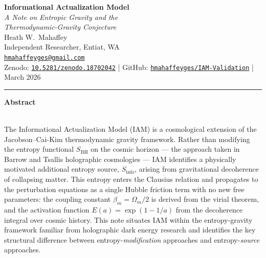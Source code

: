 \documentclass[12pt]{article}
\newcommand{\Oms}{\Omega_m}
\newcommand{\bm}{\beta_m}
\newcommand{\Ea}{E(a)}
\newcommand{\Sbh}{S_\mathrm{BH}}
\newcommand{\Sinfo}{S_\mathrm{info}}
\begin{document}
\begin{center}
  {\LARGE\bfseries\color{iamblue}
    Informational Actualization Model}\\[6pt]
  {\large\itshape
    A Note on Entropic Gravity and the\\
    Thermodynamic-Gravity Conjecture}\\[10pt]
  {\normalsize
    Heath W.\ Mahaffey\\
    Independent Researcher, Entiat, WA\\
    \href{mailto:hmahaffeyges@gmail.com}{\texttt{hmahaffeyges@gmail.com}}}\\[4pt]
  {\small\color{midgray}
    Zenodo: \href{https://doi.org/10.5281/zenodo.18702042}{\texttt{10.5281/zenodo.18702042}}
    \quad|\quad
    GitHub: \href{https://github.com/hmahaffeyges/IAM-Validation}{\texttt{hmahaffeyges/IAM-Validation}}
    \quad|\quad
    March 2026}
\end{center}

\vspace{4pt}
{\color{iamblue}\rule{\linewidth}{1pt}}
\vspace{4pt}

\begin{center}
  \small
    \textbf{Abstract}\\
\end{center}
\begin{center}
  \begin{minipage}{0.80\linewidth}
    \small
    \textbf\\
    The Informational Actualization Model (IAM) is a cosmological extension of the
    Jacobson--Cai-Kim thermodynamic gravity framework.  Rather than modifying the
    entropy functional $\Sbh$ on the cosmic horizon --- the approach taken in Barrow
    and Tsallis holographic cosmologies --- IAM identifies a physically motivated
    additional entropy source, $\Sinfo$, arising from gravitational decoherence of
    collapsing matter.  This entropy enters the Clausius relation and propagates to the
    perturbation equations as a single Hubble friction term with no new free parameters:
    the coupling constant $\bm = \Oms/2$ is derived from the virial theorem, and the
    activation function $\Ea = \exp(1-1/a)$ from the decoherence integral over cosmic
    history.  This note situates IAM within the entropy-gravity framework familiar from
    holographic dark energy research and identifies the key structural difference between
    entropy-\emph{modification} approaches and entropy-\emph{source} approaches.
  \end{minipage}
\end{center}
\end{document}
